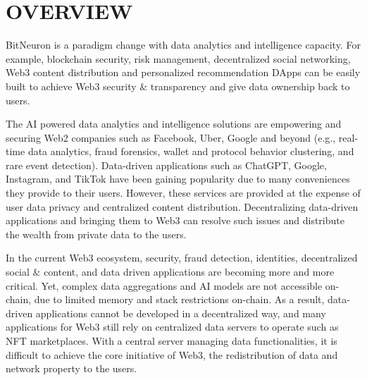 \documentclass[11pt,letterpaper]{article}
\begin{document}
\newpage

\section{OVERVIEW}
BitNeuron is a paradigm change with data analytics and intelligence capacity. For example, blockchain security, risk management, decentralized social networking, Web3 content distribution and personalized recommendation DApps can be easily built to achieve Web3 security $\&$ transparency and give data ownership back to users.

The AI powered data analytics and intelligence solutions are empowering and securing Web2 companies such as Facebook, Uber, Google and beyond (e.g., real-time data analytics, fraud forensics, wallet and protocol behavior clustering, and rare event detection). Data-driven applications such as ChatGPT, Google, Instagram, and TikTok have been gaining popularity due to many conveniences they provide to their users.
However, these services are provided at the expense of user data privacy and centralized content distribution. Decentralizing data-driven applications and bringing them to Web3 can resolve such issues and distribute the wealth from private data to the users.

In the current Web3 ecosystem, security, fraud detection, identities, decentralized social $\&$ content, and data driven applications are becoming more and more critical. Yet, complex data aggregations and AI models are not accessible on-chain, due to limited memory and stack restrictions on-chain. As a result, data-driven applications cannot be developed in a decentralized way, and many applications for Web3 still rely on centralized data servers to operate such as NFT marketplaces. With a central server managing data functionalities, it is difficult to achieve the core initiative of Web3, the redistribution of data and network property to the users.
\end{document}
